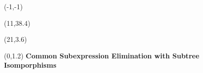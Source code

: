 \documentclass[landscape]{a0poster}
\def\Title#1{\noindent\textbf{{\VeryHuge\color{Red} #1}}}
\begin{document}

\begin{textblock}{20}(-1,-1) 
\end{textblock} 

\begin{textblock}{20}(11,38.4) 
\end{textblock} 

\begin{textblock}{2}(21,3.6) %
\end{textblock} %








\begin{textblock}{25}(0,1.2) %
	\Title{Common Subexpression Elimination with Subtree Isomporphisms }
\end{textblock} %
\end{document}
